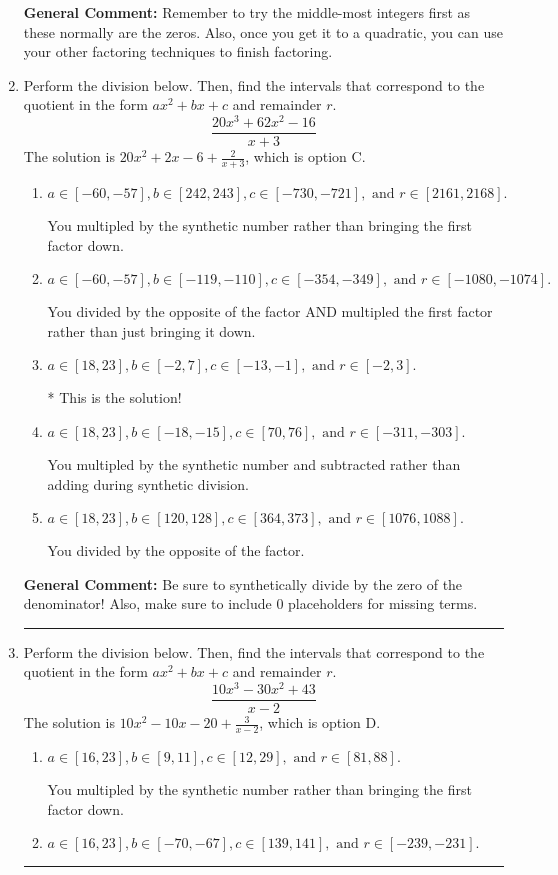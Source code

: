 \documentclass{extbook}[14pt]
\newcommand{\litem}[1]{\item #1

\rule{\textwidth}{0.4pt}}
\begin{document}
\begin{enumerate}
{\textbf{General Comment:} Remember to try the middle-most integers first as these normally are the zeros. Also, once you get it to a quadratic, you can use your other factoring techniques to finish factoring.
}
\litem{
Perform the division below. Then, find the intervals that correspond to the quotient in the form $ax^2+bx+c$ and remainder $r$.
\[ \frac{20x^{3} +62 x^{2} -16}{x + 3} \]The solution is \( 20x^{2} +2 x -6 + \frac{2}{x + 3} \), which is option C.\begin{enumerate}[label=\Alph*.]
\item \( a \in [-60, -57], b \in [242, 243], c \in [-730, -721], \text{ and } r \in [2161, 2168]. \)

 You multipled by the synthetic number rather than bringing the first factor down.
\item \( a \in [-60, -57], b \in [-119, -110], c \in [-354, -349], \text{ and } r \in [-1080, -1074]. \)

 You divided by the opposite of the factor AND multipled the first factor rather than just bringing it down.
\item \( a \in [18, 23], b \in [-2, 7], c \in [-13, -1], \text{ and } r \in [-2, 3]. \)

* This is the solution!
\item \( a \in [18, 23], b \in [-18, -15], c \in [70, 76], \text{ and } r \in [-311, -303]. \)

 You multipled by the synthetic number and subtracted rather than adding during synthetic division.
\item \( a \in [18, 23], b \in [120, 128], c \in [364, 373], \text{ and } r \in [1076, 1088]. \)

 You divided by the opposite of the factor.
\end{enumerate}

\textbf{General Comment:} Be sure to synthetically divide by the zero of the denominator! Also, make sure to include 0 placeholders for missing terms.
}
\litem{
Perform the division below. Then, find the intervals that correspond to the quotient in the form $ax^2+bx+c$ and remainder $r$.
\[ \frac{10x^{3} -30 x^{2} + 43}{x -2} \]The solution is \( 10x^{2} -10 x -20 + \frac{3}{x -2} \), which is option D.\begin{enumerate}[label=\Alph*.]
\item \( a \in [16, 23], b \in [9, 11], c \in [12, 29], \text{ and } r \in [81, 88]. \)

 You multipled by the synthetic number rather than bringing the first factor down.
\item \( a \in [16, 23], b \in [-70, -67], c \in [139, 141], \text{ and } r \in [-239, -231]. \)


\end{enumerate}}
\end{enumerate}
\end{document}
